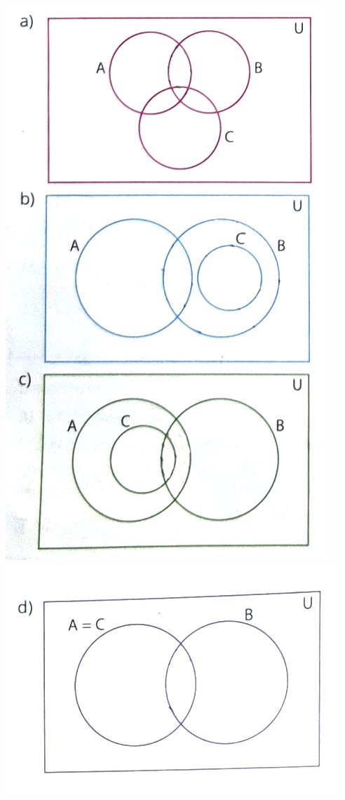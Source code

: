 \documentclass[a4paper,14pt]{article}
\begin{document}
\begin{multicols}{2}
\begin{enumerate}
    				\includegraphics[width=1\linewidth]{imagens_6FMA51/imagem2}
    				\includegraphics[width=1\linewidth]{imagens_6FMA51/imagem3}
    				

\end{enumerate}
\end{multicols}
\end{document}
